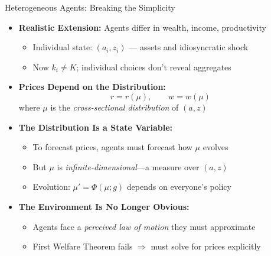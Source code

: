 \documentclass[10pt,english,aspectratio=169]{beamer}
\begin{document}
\begin{frame}{Heterogeneous Agents: Breaking the Simplicity}
\begin{itemize}
\item \textbf{Realistic Extension:} Agents differ in wealth, income, productivity
\begin{itemize}
    \item Individual state: $(a_i, z_i)$ --- assets and idiosyncratic shock
    \item Now $k_i \neq K$; individual choices don't reveal aggregates
\end{itemize}

\medskip
\item \textbf{Prices Depend on the Distribution:}
\[
r = r(\mu), \qquad w = w(\mu)
\]
where $\mu$ is the \emph{cross-sectional distribution} of $(a, z)$

\medskip
\item \textbf{The Distribution Is a State Variable:}
\begin{itemize}
    \item To forecast prices, agents must forecast how $\mu$ evolves
    \item But $\mu$ is \emph{infinite-dimensional}---a measure over $(a, z)$
    \item Evolution: $\mu' = \Phi(\mu; g)$ depends on everyone's policy
\end{itemize}

\medskip
\item \textbf{The Environment Is No Longer Obvious:}
\begin{itemize}
    \item Agents face a \emph{perceived law of motion} they must approximate
    \item First Welfare Theorem fails $\Rightarrow$ must solve for prices explicitly
\end{itemize}
\end{itemize}
\end{frame}
\end{document}
